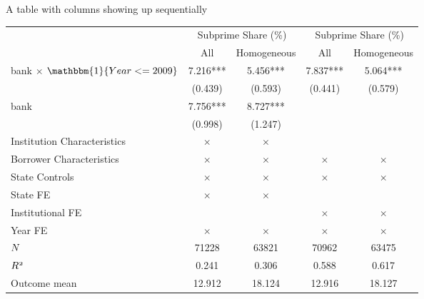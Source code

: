 \documentclass[notes,11pt, aspectratio=169]{beamer}
\begin{document}
\begin{frame}{A table with columns showing up sequentially}
\begin{table}
\centering
\begin{adjustbox}{max width=0.75\textwidth}
\begin{tabular}{lc<{\onslide<2->}c<{\onslide<3->}cc<{\onslide}}
  \toprule
  &\multicolumn{2}{c}{Subprime Share (\%)}&\multicolumn{2}{c}{Subprime Share (\%)}\\\cmidrule(lr){2-3}\cmidrule(lr){4-5}
  &\multicolumn{1}{c}{All}&\multicolumn{1}{c}{Homogeneous}&\multicolumn{1}{c}{All}&\multicolumn{1}{c}{Homogeneous}\\
  \midrule
  bank $\times$ $\mathbbm{1}\{ Year <=2009 \}$&    7.216***&    5.456***&    7.837***&    5.064***\\
                  &  (0.439)   &  (0.593)   &  (0.441)   &  (0.579)   \\
  \addlinespace
  bank            &    7.756***&    8.727***&            &            \\
                  &  (0.998)   &  (1.247)   &            &            \\
  \addlinespace
  Institution Characteristics & $\times$   & $\times$   &            &            \\
  \addlinespace
  Borrower Characteristics & $\times$   & $\times$   & $\times$   & $\times$   \\
  \addlinespace
  State Controls  & $\times$   & $\times$   & $\times$   & $\times$   \\
  \addlinespace
  State FE        & $\times$   & $\times$   &            &            \\
  \addlinespace
  Institutional FE&            &            & $\times$   & $\times$   \\
  \addlinespace
  Year FE         & $\times$   & $\times$   & $\times$   & $\times$   \\
  \midrule
  $\mathnormal{N}$&    71228   &    63821   &    70962   &    63475   \\
  $\mathnormal{R^2}$&    0.241   &    0.306   &    0.588   &    0.617   \\
  Outcome mean    &   12.912   &   18.124   &   12.916   &   18.127   \\
  \bottomrule
  \end{tabular}
\end{adjustbox}
\end{table}
\end{frame}
\end{document}
